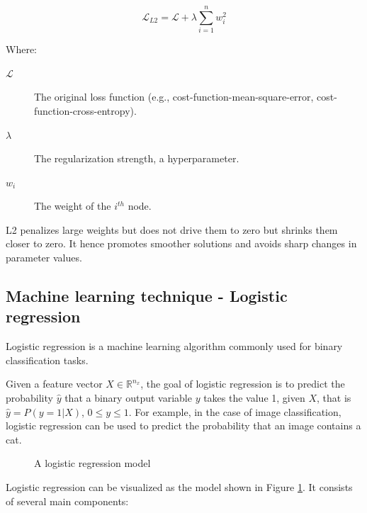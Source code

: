 		\begin{equation}
			\mathcal{L}_{L2} = \mathcal{L} + \lambda \sum_{i=1}^n w_i^2
		\end{equation}
		
		Where:
		\begin{description}
			\item[$\mathcal{L}$] The original loss function (e.g., cost-function-mean-square-error, cost-function-cross-entropy).
			\item[$\lambda$] The regularization strength, a hyperparameter.
			\item[$w_i$] The weight of the $i^{th}$ node.
		\end{description}
		\bigskip
		
		
		L2 penalizes large weights but does not drive them to zero but shrinks them closer to zero. It hence promotes smoother solutions and avoids sharp changes in parameter values.





	\bigskip
	\subsection{Machine learning technique - Logistic regression}

		
		Logistic regression is a machine learning algorithm commonly used for binary classification tasks.
		
		Given a feature vector $X \in \mathbb{R}^{n_x}$, the goal of logistic regression is to predict the probability $\hat{y}$ that a binary output variable $y$ takes the value 1, given $X$, that is $\hat{y} = P(y=1|X)$, $0\le y\le1$. 
		For example, in the case of image classification, logistic regression can be used to predict the probability that an image contains a cat.
		
		\begin{figure}[H]
			\centering
			
			\caption{A logistic regression model}
			\label{fig:logisticregression}
		\end{figure}
		
		
		Logistic regression can be visualized as the model shown in Figure \ref{fig:logisticregression}. It consists of several main components:
		

